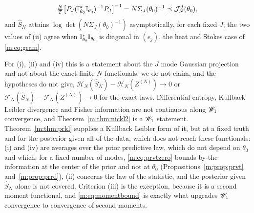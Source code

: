\begin{proposition}
\begin{enumerate}[label=(\alph*),nosep]
\[
\tfrac NT\big[P_J(\mathbb{I}^*_{\theta_0}\mathbb{I}_{\theta_0})^{-1}P_J\big]^{-1}=N\Sigma_J(\theta_0)^{-1}\preceq\mathcal J^J_N(\theta_0) ,
\]
and $\hat S_N$ attains $\log\det(N\Sigma_J(\theta_0)^{-1})$ asymptotically, for each fixed $J$; the two values of (ii) agree when $\mathbb{I}^*_{\theta_0}\mathbb{I}_{\theta_0}$ is diagonal in $(e_j)$, the heat and Stokes case of \eqref{m:eq:gram}.
\end{enumerate}
For (i), (ii) and (iv) this is a statement about the $J$ mode Gaussian projection and not about the exact finite $N$ functionals: we do not claim, and the hypotheses do not give, $\mathcal H_N(\hat S_N)-\mathcal H_N(Z^{(N)})\to0$ or $\mathcal F_N(\hat S_N)-\mathcal F_N(Z^{(N)})\to0$ for the exact laws. Differential entropy, Kullback Leibler divergence and Fisher information are not continuous along $\mathscr{W}_1$ convergence, and Theorem~\ref{m:thm:nickl2} is a $\mathscr{W}_1$ statement. Theorem~\ref{m:thm:prkl} supplies a Kullback Leibler form of it, but at a fixed truth and for the posterior given all of the data, which does not reach these functionals: (i) and (iv) are averages over the prior predictive law, which do not depend on $\theta_0$ and which, for a fixed number of modes, \eqref{m:eq:prvtzero} bounds by the information at the center of the prior and not at $\theta_0$ (Propositions~\ref{m:prop:prvt} and~\ref{m:prop:prrd}), (ii) concerns the law of the statistic, and the posterior given $\hat S_N$ alone is not covered. Criterion (iii) is the exception, because it is a second moment functional, and \eqref{m:eq:momentbound} is exactly what upgrades $\mathscr{W}_1$ convergence to convergence of second moments.
\end{proposition}

